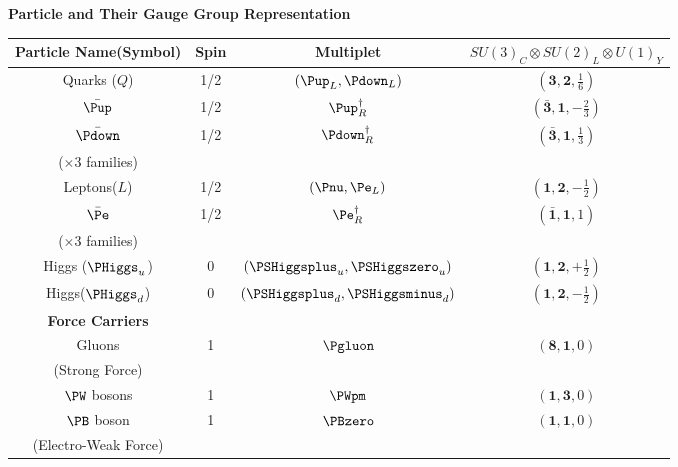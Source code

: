 \clearpage
\begin{center}
\centering
 \bfseries{Particle and Their Gauge Group Representation}
\begin{tabular}{|c|c|c|c|}
\hline
\bfseries{Particle Name(Symbol)} & \bfseries{Spin} & \bfseries{Multiplet} & \bfseries {$SU(3)_{C} \otimes SU(2)_{L} \otimes U(1)_{Y}$}\\
\hline\hline
 Quarks ($Q$) & 1/2 & $(\Pup_{L}, \Pdown_{L})$  & $(\mathbf{3}, \mathbf{2}, \frac{1}{6})$\\
 $\bar{\Pup}$ & 1/2 & ${\Pup^{\dagger}_{R}} $& $(\mathbf{\bar{3}}, \mathbf{1}, -\frac{2}{3})$\\
 $\bar{\Pdown}$ & 1/2 & ${\Pdown^{\dagger}_{R}} $& $(\mathbf{\bar{3}}, \mathbf{1}, \frac{1}{3})$\\
 ($\times 3$ families) & & & \\
\hline
 Leptons($L$) & 1/2 &  $(\Pnu, \Pe_{L} )$ & $(\mathbf{1}, \mathbf{2}, -\frac{1}{2})$\\
 $\bar{\Pe}$ & 1/2 & ${\Pe^{\dagger}_{R}} $& $(\mathbf{\bar{1}}, \mathbf{1}, 1)$\\
 ($\times 3$ families) & & & \\
\hline
Higgs ($\PHiggs_{u} $) & 0 & $(\PSHiggsplus_{u}, \PSHiggszero_{u})$ &  $(\mathbf{1}, \mathbf{2}, +\frac{1}{2})$ \\
Higgs($\PHiggs_{d}$)   & 0 & $(\PSHiggsplus_{d}, \PSHiggsminus_{d})$ &  $(\mathbf{1}, \mathbf{2}, -\frac{1}{2})$ \\
\hline\hline
\bfseries{Force Carriers} &  & & \\
 Gluons & 1 & $\Pgluon$ & $(\mathbf{8}, \mathbf{1}, 0)$ \\
 (Strong Force) & & & \\
 \hline
 $\PW$ bosons & 1 & $\PWpm$ & $(\mathbf{1}, \mathbf{3}, 0)$ \\
 $\PB$ boson & 1 & $\PBzero$ & $(\mathbf{1}, \mathbf{1}, 0)$ \\
 (Electro-Weak Force) & & & \\
\hline \hline
\end{tabular}
\label{tab:SM} 
\end{center}


